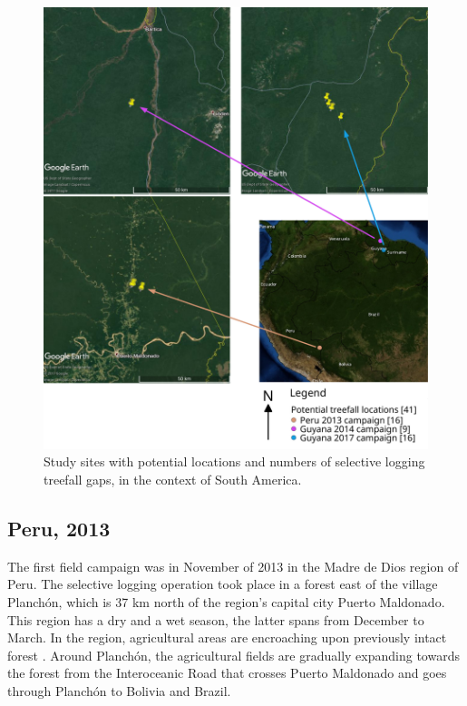 \documentclass[a4paper,12pt]{scrbook}
\begin{document}
\begin{figure}
    \centering
    \includegraphics[width=\textwidth]{thesis-figures/17-all-sites-odg}
    \caption{Study sites with potential locations and numbers of selective logging treefall gaps, in the context of South America.}
    \label{fig-all-sites}
\end{figure}

\subsection{Peru, 2013}

The first field campaign was in November of 2013 in the Madre de Dios region of Peru. The selective logging operation took place in a forest east of the village Planchón, which is 37 km north of the region's capital city Puerto Maldonado. This region has a dry and a wet season, the latter spans from December to March. In the region, agricultural areas are encroaching upon previously intact forest \citep{scullion_assessing_2014}. Around Planchón, the agricultural fields are gradually expanding towards the forest from the Interoceanic Road that crosses Puerto Maldonado and goes through Planchón to Bolivia and Brazil.
\end{document}

